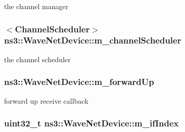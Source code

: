 the channel manager 

\subsubsection[{\texorpdfstring{m\+\_\+channel\+Scheduler}{m_channelScheduler}}]{$<${\bf Channel\+Scheduler}$>$ ns3\+::\+Wave\+Net\+Device\+::m\+\_\+channel\+Scheduler\hspace{0.3cm}{\ttfamily [private]}}\hypertarget{classns3_1_1WaveNetDevice_a64edd74de0dc4af431f2d08aad19a9d1}{}\label{classns3_1_1WaveNetDevice_a64edd74de0dc4af431f2d08aad19a9d1}


the channel scheduler 

\subsubsection[{\texorpdfstring{m\+\_\+forward\+Up}{m_forwardUp}}]{ ns3\+::\+Wave\+Net\+Device\+::m\+\_\+forward\+Up\hspace{0.3cm}{\ttfamily [private]}}\hypertarget{classns3_1_1WaveNetDevice_a323fd8350ab01fa9fa0b4a2ec6b32442}{}\label{classns3_1_1WaveNetDevice_a323fd8350ab01fa9fa0b4a2ec6b32442}


forward up receive callback 

\subsubsection[{\texorpdfstring{m\+\_\+if\+Index}{m_ifIndex}}]{\setlength{\rightskip}{0pt plus 5cm}uint32\+\_\+t ns3\+::\+Wave\+Net\+Device\+::m\+\_\+if\+Index\hspace{0.3cm}{\ttfamily [private]}}\hypertarget{classns3_1_1WaveNetDevice_a6b8a6a87173e27fc9bdcbb45e1e395bd}{}\label{classns3_1_1WaveNetDevice_a6b8a6a87173e27fc9bdcbb45e1e395bd}


